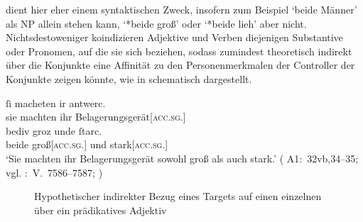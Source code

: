  dient hier eher einem syntaktischen Zweck, insofern zum
Beispiel  `beide Männer' als NP allein stehen kann,
 `*beide groß' oder
 `*beide lieh' aber nicht.
Nichtsdestoweniger koindizieren Adjektive und Verben diejenigen Substantive
oder Pronomen, auf die sie sich beziehen, sodass  zumindest
theoretisch indirekt über die Konjunkte eine Affinität zu den Personenmerkmalen
der Controller der Konjunkte zeigen könnte, wie in 
schematisch dargestellt.

\begin{exe}
\ex\label{ex:recquery}
	\gll ſi macheten ir antwerc. \\
		sie machten ihr Belagerungsgerät[\textsc{acc.sg.\NeutI}] \\
\sn \gll bediv groz unde ſtarc. \\
		beide groß[\textsc{acc.sg.\NeutI}] und stark[\textsc{acc.sg.\NeutI}] \\
	\trans `Sie machten ihr Belagerungsgerät sowohl groß als auch stark.'
			(%
				A1:~32vb,34--35; vgl.
				\KC:~V.~7586--7587;
				\cite[220]{schroeder1895}%
			)
\end{exe}

\begin{figure}
\caption{Hypothetischer indirekter Bezug eines Targets auf einen einzelnen  über ein prädikatives Adjektiv}
\label{fig:recquery}
\end{figure}

